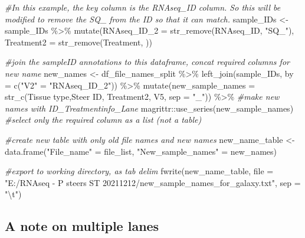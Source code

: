 \documentclass[
]{book}
\newenvironment{Shaded}{\begin{snugshade}}{\end{snugshade}}
\newcommand{\AttributeTok}[1]{\textcolor[rgb]{0.77,0.63,0.00}{#1}}
\newcommand{\CommentTok}[1]{\textcolor[rgb]{0.56,0.35,0.01}{\textit{#1}}}
\newcommand{\FunctionTok}[1]{\textcolor[rgb]{0.00,0.00,0.00}{#1}}
\newcommand{\NormalTok}[1]{#1}
\newcommand{\OtherTok}[1]{\textcolor[rgb]{0.56,0.35,0.01}{#1}}
\newcommand{\SpecialCharTok}[1]{\textcolor[rgb]{0.00,0.00,0.00}{#1}}
\newcommand{\StringTok}[1]{\textcolor[rgb]{0.31,0.60,0.02}{#1}}
\begin{document}
\begin{Shaded}
\begin{Highlighting}[]
\CommentTok{\#In this example, the \textquotesingle{}key\textquotesingle{} column is the RNAseq\_ID column. So this will be modified to remove the \textquotesingle{}SQ\_\textquotesingle{} from the ID so that it can match.}
\NormalTok{sample\_IDs }\OtherTok{\textless{}{-}} 
\NormalTok{  sample\_IDs }\SpecialCharTok{\%\textgreater{}\%} 
  \FunctionTok{mutate}\NormalTok{(}\AttributeTok{RNAseq\_ID\_2 =} \FunctionTok{str\_remove}\NormalTok{(RNAseq\_ID, }\StringTok{"SQ\_"}\NormalTok{),}
         \AttributeTok{Treatment2 =} \FunctionTok{str\_remove}\NormalTok{(Treatment, }\StringTok{\textquotesingle{}{-}\textquotesingle{}}\NormalTok{))}

\CommentTok{\#join the sampleID annotations to this dataframe, concat required columns for new name}
\NormalTok{new\_names }\OtherTok{\textless{}{-}}\NormalTok{ df\_file\_names\_split }\SpecialCharTok{\%\textgreater{}\%} 
  \FunctionTok{left\_join}\NormalTok{(sample\_IDs, }\AttributeTok{by =} \FunctionTok{c}\NormalTok{(}\StringTok{"V2"} \OtherTok{=} \StringTok{"RNAseq\_ID\_2"}\NormalTok{)) }\SpecialCharTok{\%\textgreater{}\%} 
  \FunctionTok{mutate}\NormalTok{(}\AttributeTok{new\_sample\_names =} \FunctionTok{str\_c}\NormalTok{(}\StringTok{\textasciigrave{}}\AttributeTok{Tissue type}\StringTok{\textasciigrave{}}\NormalTok{,}\StringTok{\textasciigrave{}}\AttributeTok{Steer ID}\StringTok{\textasciigrave{}}\NormalTok{, Treatment2, V5, }\AttributeTok{sep =} \StringTok{"\_"}\NormalTok{)) }\SpecialCharTok{\%\textgreater{}\%} \CommentTok{\#make new names with ID\_Treatmentinfo\_Lane}
\NormalTok{  magrittr}\SpecialCharTok{::}\FunctionTok{use\_series}\NormalTok{(new\_sample\_names) }\CommentTok{\#select only the required column as a list (not a table)}

\CommentTok{\#create new table with only old file names and new names}
\NormalTok{new\_name\_table }\OtherTok{\textless{}{-}}
  \FunctionTok{data.frame}\NormalTok{(}\StringTok{"File\_name"} \OtherTok{=}\NormalTok{ file\_list, }\StringTok{"New\_sample\_names"} \OtherTok{=}\NormalTok{ new\_names)}

\CommentTok{\#export to working directory, as tab delim }
\FunctionTok{fwrite}\NormalTok{(new\_name\_table, }\AttributeTok{file =} \StringTok{"E:/RNAseq {-} P steers ST 20211212/new\_sample\_names\_for\_galaxy.txt"}\NormalTok{, }\AttributeTok{sep =} \StringTok{"}\SpecialCharTok{\textbackslash{}t}\StringTok{"}\NormalTok{)}
\end{Highlighting}
\end{Shaded}

\hypertarget{a-note-on-multiple-lanes}{%
\subsection*{A note on multiple lanes}\label{a-note-on-multiple-lanes}}
\end{document}
